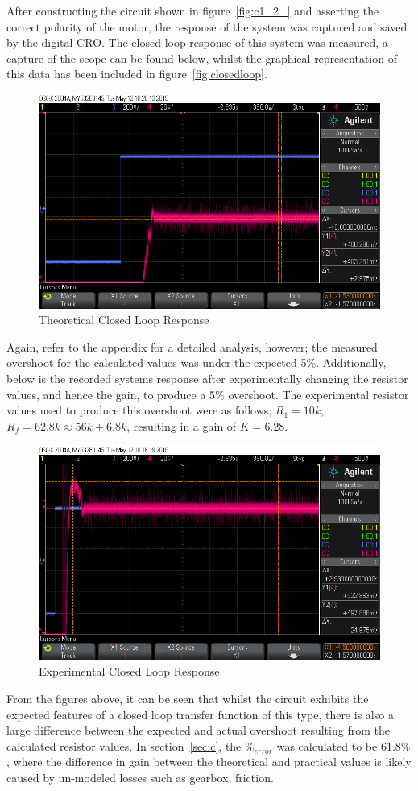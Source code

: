 \documentclass[11pt,a4paper]{article}
\begin{document}
After constructing the circuit shown in figure~\ref{fig:c1_2_} and asserting the correct polarity of the motor, the response of the system was captured and saved by the digital CRO. The closed loop response of this system was measured, a capture of the scope can be found below, whilst the graphical representation of this data has been included in figure~\ref{fig:closedloop}.\\
	\begin{figure}[H]
		\centering
			\includegraphics[width=0.5\linewidth]{Oscilloscope/PartC_Theoretical_Overshoot.png} 
			\caption{Theoretical Closed Loop Response}
			\label{fig:calcgain}
	\end{figure}


Again, refer to the appendix for a detailed analysis, however; the measured overshoot for the calculated values was under the expected 5\%. Additionally, below is the recorded systems response after experimentally changing the resistor values, and hence the gain, to produce a 5\% overshoot. The experimental resistor values used to produce this overshoot were as follows; $R_1 = 10k$, $R_f = 62.8k \approx 56k + 6.8k$, resulting in a gain of $K = 6.28$. 

	\begin{figure}[H]
		\centering
		\includegraphics[width=0.5\linewidth]{Oscilloscope/PartC_Experimental_Overshoot.png}
		\caption{Experimental Closed Loop Response}
		\label{fig:expgain}
	\end{figure}

From the figures above, it can be seen that whilst the circuit exhibits the expected features of a closed loop transfer function of this type, there is also a large difference between the expected and actual overshoot resulting from the calculated resistor values. In section~\ref{sec:c}, the $\%_{error}$ was calculated to be $61.8\%$, where the difference in gain between the theoretical and practical values is likely caused by un-modeled losses such as gearbox, friction.
\end{document}
